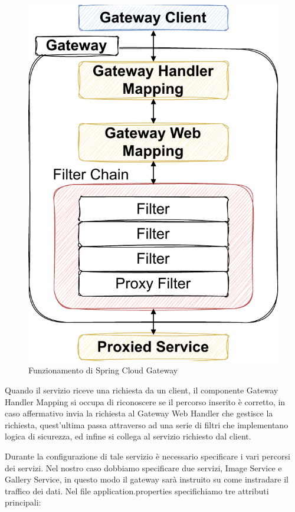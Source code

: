 \begin{figure}[h]
    \centering
    \includegraphics[scale=0.65]{capitoli/immagini/15_gateway_work.pdf}
    \caption{Funzionamento di Spring Cloud Gateway}
    \label{fig:gateway_work}
\end{figure}

Quando il servizio riceve una richiesta da un client, il componente Gateway Handler Mapping si occupa di riconoscere se il percorso inserito è corretto, in caso affermativo invia la richiesta al Gateway Web Handler che gestisce la richiesta, quest'ultima passa attraverso ad una serie di filtri che implementano logica di sicurezza, ed infine si collega al servizio richiesto dal client.

Durante la configurazione di tale servizio è necessario specificare i vari percorsi dei servizi. Nel nostro caso dobbiamo specificare due servizi, Image Service e Gallery Service, in questo modo il gateway sarà instruito su come instradare il traffico dei dati. Nel file application.properties specifichiamo tre attributi principali:

